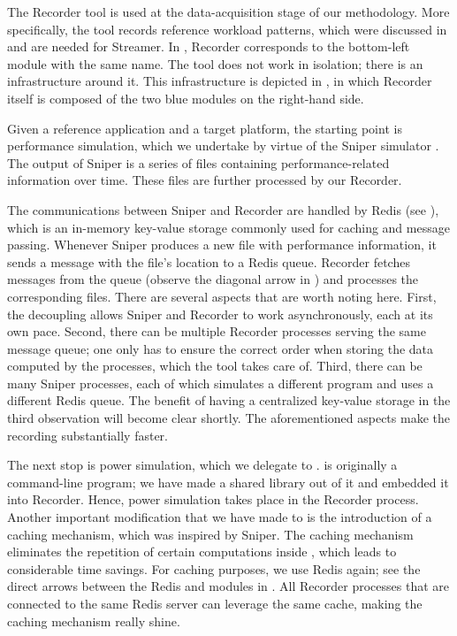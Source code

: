 
The Recorder tool is used at the data-acquisition stage of our methodology. More
specifically, the tool records reference workload patterns, which were discussed
in  and are needed for Streamer. In , Recorder
corresponds to the bottom-left module with the same name. The tool does not work
in isolation; there is an infrastructure around it. This infrastructure is
depicted in , in which Recorder itself is composed of the two
blue modules on the right-hand side.

Given a reference application and a target platform, the starting point is
performance simulation, which we undertake by virtue of the Sniper simulator
\cite{carlson2011}. The output of Sniper is a series of files containing
performance-related information over time. These files are further processed by
our Recorder.

The communications between Sniper and Recorder are handled by Redis (see
), which is an in-memory key-value storage commonly used for
caching and message passing. Whenever Sniper produces a new file with
performance information, it sends a message with the file's location to a Redis
queue. Recorder fetches messages from the queue (observe the diagonal arrow in
) and processes the corresponding files. There are several
aspects that are worth noting here. First, the decoupling allows Sniper and
Recorder to work asynchronously, each at its own pace. Second, there can be
multiple Recorder processes serving the same message queue; one only has to
ensure the correct order when storing the data computed by the processes, which
the tool takes care of. Third, there can be many Sniper processes, each of which
simulates a different program and uses a different Redis queue. The benefit of
having a centralized key-value storage in the third observation will become
clear shortly. The aforementioned aspects make the recording substantially
faster.

The next stop is power simulation, which we delegate to 
\cite{li2009}.  is originally a command-line program; we have made a
shared library out of it and embedded it into Recorder. Hence, power simulation
takes place in the Recorder process. Another important modification that we have
made to  is the introduction of a caching mechanism, which was
inspired by Sniper. The caching mechanism eliminates the repetition of certain
computations inside , which leads to considerable time savings. For
caching purposes, we use Redis again; see the direct arrows between the Redis
and  modules in . All Recorder processes that are
connected to the same Redis server can leverage the same cache, making the
caching mechanism really shine.


